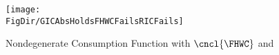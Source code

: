 \hypertarget{GICAbsHoldsFHWCFailsRICFails}{}
\begin{figure}
\centerline{\texttt{[image: \\FigDir/GICAbsHoldsFHWCFailsRICFails]}}
\caption{Nondegenerate Consumption Function with $\cncl{\FHWC}$ and \cncl{\RIC}}
\label{fig:GICAbsHoldsFHWCFailsRICFails}
\end{figure}
